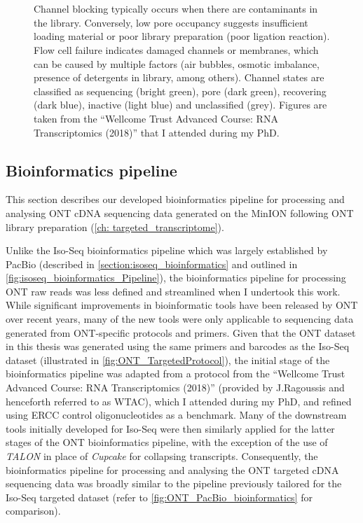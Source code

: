 \begin{figure}[]
{	\\ \\
	Channel blocking typically occurs when there are contaminants in the library. Conversely, low pore occupancy suggests insufficient loading material or poor library preparation (poor ligation reaction). Flow cell failure indicates damaged channels or membranes, which can be caused by multiple factors (air bubbles, osmotic imbalance, presence of detergents in library, among others). Channel states are classified as sequencing (bright green), pore (dark green), recovering (dark blue), inactive (light blue) and unclassified (grey). Figures are taken from the “Wellcome Trust Advanced Course: RNA Transcriptomics (2018)” that I attended during my PhD.}
	\label{fig:ONTPoreOccupancy}
\end{figure}

\clearpage
\subsection{Bioinformatics pipeline}
\label{section:ont_bioinformatics}
This section describes our developed bioinformatics pipeline for processing and analysing ONT cDNA sequencing data generated on the MinION following ONT library preparation (\cref{ch: targeted_transcriptome}). 

Unlike the Iso-Seq bioinformatics pipeline which was largely established by PacBio (described in \cref{section:isoseq_bioinformatics} and outlined in \cref{fig:isoseq_bioinformatics_Pipeline}), the bioinformatics pipeline for processing ONT raw reads was less defined and streamlined when I undertook this work. While significant improvements in bioinformatic tools have been released by ONT over recent years, many of the new tools were only applicable to sequencing data generated from ONT-specific protocols and primers. Given that the ONT dataset in this thesis was generated using the same primers and barcodes as the Iso-Seq dataset (illustrated in \cref{fig:ONT_TargetedProtocol}), the initial stage of the bioinformatics pipeline was adapted from a protocol from the “Wellcome Trust Advanced Course: RNA Transcriptomics (2018)” (provided by J.Ragoussis and henceforth referred to as WTAC), which I attended during my PhD, and refined using ERCC control oligonucleotides as a benchmark. Many of the downstream tools initially developed for Iso-Seq were then similarly applied for the latter stages of the ONT bioinformatics pipeline, with the exception of the use of \textit{TALON} in place of \textit{Cupcake} for collapsing transcripts.  Consequently, the bioinformatics pipeline for processing and analysing the ONT targeted cDNA sequencing data was broadly similar to the pipeline previously tailored for the Iso-Seq targeted dataset (refer to \cref{fig:ONT_PacBio_bioinformatics} for comparison). 

